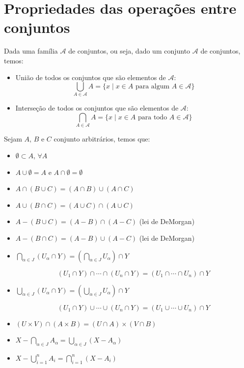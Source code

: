  \newpage
 \section{Propriedades das operações entre conjuntos}

 Dada uma família $\mathcal{A}$ de conjuntos, ou seja, dado um conjunto $\mathcal{A}$ de conjuntos, temos:
 \begin{itemize}
 \item União de todos os conjuntos que são elementos de $\mathcal{A}$:
 $$\bigcup_{A \in \mathcal{A}} A = \{x\mid x \in A \text{ para algum } A \in \mathcal{A}\}$$
 \item Interseção de todos os conjuntos que são elementos de $\mathcal{A}$:
 $$\bigcap_{A \in \mathcal{A}} A = \{x\mid x \in A \text{ para todo } A \in \mathcal{A}\}$$
\end{itemize}

\begin{prop}
Sejam $A$, $B$ e $C$ conjunto arbitrários, temos que:
\begin{itemize}
 \item $\emptyset \subset A$, $\forall A$
 \item $A \cup \emptyset= A$ e $A \cap \emptyset= \emptyset$
 \item $A \cap (B \cup C) = (A \cap B) \cup (A \cap C)$
 \item $A \cup (B \cap C) = (A \cup C) \cap (A \cup C)$
 \item $A - (B \cup C) = (A - B) \cap (A - C)$ (lei de DeMorgan)
 \item $A - (B \cap C) = (A - B) \cup (A - C)$ (lei de DeMorgan)
 \item $\bigcap_{\alpha \in J}(U_{\alpha} \cap Y) = (\bigcap_{\alpha \in J} U_{\alpha}) \cap Y$

  $$(U_1 \cap Y) \cap \cdots \cap (U_n \cap Y) = (U_1 \cap \cdots \cap U_n) \cap Y$$

 \item $\bigcup_{\alpha \in J}(U_{\alpha} \cap Y) = (\bigcup_{\alpha \in J} U_{\alpha}) \cap Y$

 $$(U_1 \cap Y) \cup \cdots \cup (U_n \cap Y) = (U_1 \cup \cdots \cup U_n) \cap Y$$

 \item $(U \times V) \cap (A \times B) = (U \cap A) \times (V \cap B)$

 \item $X - \bigcap_{\alpha \in J} A_{\alpha} = \bigcup_{\alpha \in J}(X - A_{\alpha})$

 \item $X - \bigcup_{i= 1}^{n} A_i = \bigcap_{i = 1}^{n}(X - A_i)$

\end{itemize}
\end{prop}

